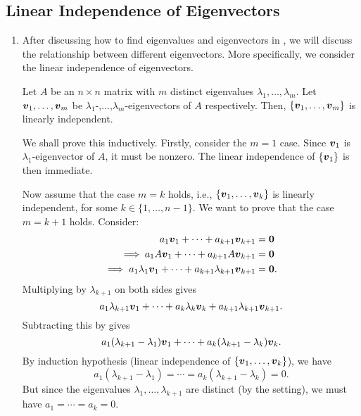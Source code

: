 \subsection{Linear Independence of Eigenvectors}
\begin{enumerate}
\item After discussing how to find eigenvalues and eigenvectors in
, we will discuss the relationship between different
eigenvectors. More specifically, we consider the linear independence of
eigenvectors.

\begin{theorem}
\label{thm:diff-eigenval-eigenvec-li}
Let \(A\) be an \(n\times n\) matrix with \(m\) distinct eigenvalues
\(\lambda_1,\dotsc,\lambda_m\). Let \(\vb*{v}_1,\dotsc,\vb*{v}_m\) be
\(\lambda_1\)-,...,\(\lambda_m\)-eigenvectors of \(A\) respectively. Then,
\(\{\vb*{v}_1,\dotsc,\vb*{v}_m\}\) is linearly independent.
\end{theorem}
\begin{pf}
We shall prove this inductively. Firstly, consider the \(m=1\) case. Since
\(\vb*{v}_1\) is \(\lambda_1\)-eigenvector of \(A\), it must be nonzero.  The
linear independence of \(\{\vb*{v}_1\}\) is then immediate.

Now assume that the case \(m=k\) holds, i.e.,
\(\{\vb*{v}_1,\dotsc,\vb*{v}_k\}\) is linearly independent, for some
\(k\in\{1,\dotsc,n-1\}\). We want to prove that the case \(m=k+1\) holds.
Consider:
\begin{align}
\label{eq:li-kp1} a_{1}\vb*{v}_1+\dotsb+a_{k+1}\vb*{v}_{k+1}&=\vb*{0} \\
\implies a_{1}A\vb*{v}_1+\dotsb+a_{k+1}A\vb*{v}_{k+1}&=\vb*{0}\nonumber \\
\label{eq:li-kp1-lambda}
\implies a_{1}\lambda_{1}\vb*{v}_1+\dotsb+a_{k+1}\lambda_{k+1}\vb*{v}_{k+1}&=\vb*{0}.
\end{align}
Multiplying  by \(\lambda_{k+1}\) on both sides gives
\[
a_1\lambda_{k+1}\vb*{v}_1+\dotsb
+a_{k}\lambda_{k}\vb*{v}_{k}
+a_{k+1}\lambda_{k+1}\vb*{v}_{k+1}.
\]
Subtracting this by  gives
\[
a_1(\lambda_{k+1}-\lambda_1)\vb*{v}_1+\dotsb+a_{k}(\lambda_{k+1}-\lambda_k)\vb*{v}_{k}.
\]
By induction hypothesis (linear independence of
\(\{\vb*{v}_1,\dotsc,\vb*{v}_k\}\)), we have
\[
a_1(\lambda_{k+1}-\lambda_1)=\dotsb=a_k(\lambda_{k+1}-\lambda_k)=0.
\]
But since the eigenvalues \(\lambda_1,\dotsc,\lambda_{k+1}\) are distinct (by
the setting), we must have \(a_1=\dotsb=a_k=0\).


\end{pf}
\end{enumerate}
